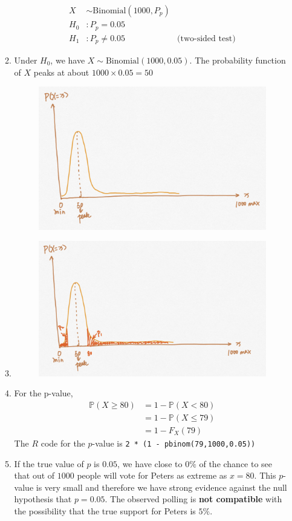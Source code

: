 \documentclass[12pt, oneside, a4paper]{article}
\begin{document}
\begin{enumerate}
\begin{enumerate}[label = (\alph*)]
\begin{align*}
				X & \sim \text{Binomial}(1000, P_p)\\
				H_0 &: P_p = 0.05 \\
				H_1 &: P_p \neq 0.05 & \text{(two-sided test)}
			\end{align*}
			\item Under $H_0$, we have $X \sim \text{Binomial}(1000,0.05)$. The probability function of $X$ peaks at about $1000 \times 0.05 = 50$
			\begin{figure}[H]
				\centering
				\includegraphics[width=0.8\linewidth]{2b}
				\label{fig:2b}
			\end{figure}
			\item \begin{figure}[h]
				\centering
				\includegraphics[width=0.8\linewidth]{2c}
				\label{fig:2c}
			\end{figure}
			\item For the p-value, \begin{align*}
				\mathbb{P}(X \geq 80)  & = 1 - \mathbb{P}(X < 80) \\
				& = 1 - \mathbb{P}(X \leq 79) \\
				& = 1 - F_X(79)
			\end{align*}
			The $R$ code for the $p$-value is \qquad \texttt{2 * (1 - pbinom(79,1000,0.05))}
			\item If the true value of $p$ is $0.05$, we have close to $0\%$ of the chance to see that out of $1000$ people will vote for Peters as extreme as $x = 80$. This $p$-value is very small and therefore we have strong evidence against the null hypothesis that $p = 0.05$. The observed polling is \textbf{not compatible} with the possibility that the true support for Peters is $5\%$.

\end{enumerate}
\end{enumerate}
\end{document}
